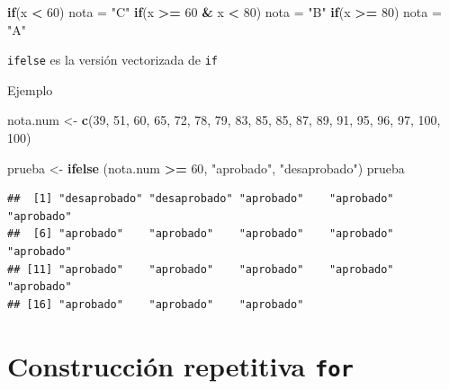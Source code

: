 \documentclass[]{book}
\newenvironment{Shaded}{\begin{snugshade}}{\end{snugshade}}
\newcommand{\KeywordTok}[1]{\textcolor[rgb]{0.13,0.29,0.53}{\textbf{#1}}}
\newcommand{\DecValTok}[1]{\textcolor[rgb]{0.00,0.00,0.81}{#1}}
\newcommand{\StringTok}[1]{\textcolor[rgb]{0.31,0.60,0.02}{#1}}
\newcommand{\ControlFlowTok}[1]{\textcolor[rgb]{0.13,0.29,0.53}{\textbf{#1}}}
\newcommand{\OperatorTok}[1]{\textcolor[rgb]{0.81,0.36,0.00}{\textbf{#1}}}
\newcommand{\NormalTok}[1]{#1}
\begin{document}
\begin{Shaded}
\begin{Highlighting}[]
\ControlFlowTok{if}\NormalTok{(x }\OperatorTok{<}\StringTok{ }\DecValTok{60}\NormalTok{) nota =}\StringTok{ "C"}
\ControlFlowTok{if}\NormalTok{(x }\OperatorTok{>=}\StringTok{ }\DecValTok{60} \OperatorTok{&}\StringTok{ }\NormalTok{x }\OperatorTok{<}\StringTok{ }\DecValTok{80}\NormalTok{) nota =}\StringTok{ "B"}
\ControlFlowTok{if}\NormalTok{(x }\OperatorTok{>=}\StringTok{  }\DecValTok{80}\NormalTok{) nota =}\StringTok{ "A"}
\end{Highlighting}
\end{Shaded}

\texttt{ifelse} es la versión vectorizada de \texttt{if}

Ejemplo

\begin{Shaded}
\begin{Highlighting}[]
\NormalTok{nota.num <-}\StringTok{ }\KeywordTok{c}\NormalTok{(}\DecValTok{39}\NormalTok{, }\DecValTok{51}\NormalTok{, }\DecValTok{60}\NormalTok{, }\DecValTok{65}\NormalTok{, }\DecValTok{72}\NormalTok{, }\DecValTok{78}\NormalTok{, }\DecValTok{79}\NormalTok{, }\DecValTok{83}\NormalTok{, }\DecValTok{85}\NormalTok{, }\DecValTok{85}\NormalTok{, }\DecValTok{87}\NormalTok{, }\DecValTok{89}\NormalTok{, }\DecValTok{91}\NormalTok{, }\DecValTok{95}\NormalTok{, }\DecValTok{96}\NormalTok{, }\DecValTok{97}\NormalTok{, }\DecValTok{100}\NormalTok{, }\DecValTok{100}\NormalTok{)}

\NormalTok{prueba <-}\StringTok{ }\KeywordTok{ifelse}\NormalTok{ (nota.num }\OperatorTok{>=}\StringTok{ }\DecValTok{60}\NormalTok{, }\StringTok{"aprobado"}\NormalTok{, }\StringTok{"desaprobado"}\NormalTok{)}
\NormalTok{prueba}
\end{Highlighting}
\end{Shaded}

\begin{verbatim}
##  [1] "desaprobado" "desaprobado" "aprobado"    "aprobado"    "aprobado"   
##  [6] "aprobado"    "aprobado"    "aprobado"    "aprobado"    "aprobado"   
## [11] "aprobado"    "aprobado"    "aprobado"    "aprobado"    "aprobado"   
## [16] "aprobado"    "aprobado"    "aprobado"
\end{verbatim}

\hypertarget{construccion-repetitiva-for}{%
\section{\texorpdfstring{Construcción repetitiva
\texttt{for}}{Construcción repetitiva for}}\label{construccion-repetitiva-for}}
\end{document}
